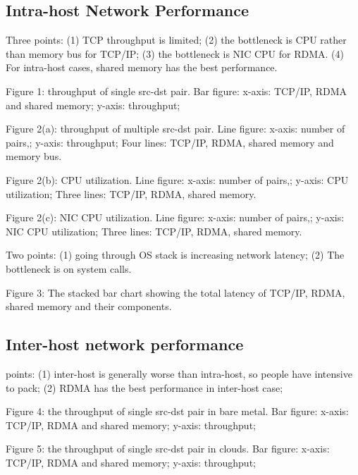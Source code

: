 \subsection{Intra-host Network Performance}


Three points: (1) TCP throughput is limited; (2) the bottleneck is CPU rather than memory bus for TCP/IP; (3) the bottleneck is NIC CPU for RDMA. (4) For intra-host cases, shared memory has the best performance.

Figure 1: throughput of single src-dst pair. Bar figure: x-axis: TCP/IP, RDMA and shared memory; y-axis: throughput;

Figure 2(a): throughput of multiple src-dst pair. Line figure: x-axis: number of pairs,; y-axis: throughput; Four lines: TCP/IP, RDMA, shared memory and memory bus.

Figure 2(b): CPU utilization. Line figure: x-axis: number of pairs,; y-axis: CPU utilization; Three lines: TCP/IP, RDMA, shared memory.

Figure 2(c): NIC CPU utilization. Line figure: x-axis: number of pairs,; y-axis: NIC CPU utilization; Three lines: TCP/IP, RDMA, shared memory.


Two points: (1) going through OS stack is increasing network latency; (2) The bottleneck is on system calls.

Figure 3: The stacked bar chart showing the total latency of TCP/IP, RDMA, shared memory and their components.


\subsection{Inter-host network performance}

points: (1) inter-host is generally worse than intra-host, so people have intensive to pack; (2) RDMA has the best performance in inter-host case;

Figure 4: the throughput of single src-dst pair in bare metal. Bar figure: x-axis: TCP/IP, RDMA and shared memory; y-axis: throughput;

Figure 5: the throughput of single src-dst pair in clouds. Bar figure: x-axis: TCP/IP, RDMA and shared memory; y-axis: throughput;
